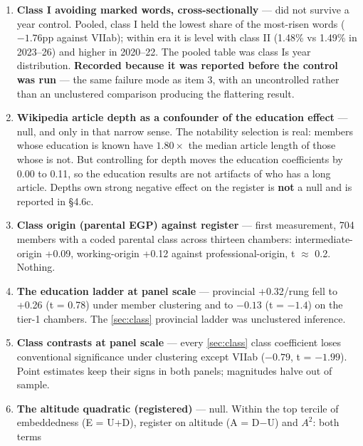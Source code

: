 \begin{enumerate}
  is 0.22--0.25\% in every class, differences within \(\pm\)0.02pp. The class effect
  is a uniform scaling of the instrument, not a re-weighting, when
  "conspicuous" is defined as rare \emph{before} the machines. Defining it
  instead as \emph{risen} and \emph{common} is what produces \cref{sec:chase-flight}\textquotesingle s result.
\item
  \textbf{Class I avoiding marked words, cross-sectionally} --- did not survive a
  year control. Pooled, class I held the lowest share of the most-risen
  words (\(-1.76\)pp against VIIab); within era it is level with class II
  (1.48\% vs 1.49\% in 2023--26) and higher in 2020--22. The pooled table was
  class I\textquotesingle s year distribution. \textbf{Recorded because it was reported before the
  control was run} --- the same failure mode as item 3, with an uncontrolled
  rather than an unclustered comparison producing the flattering result.
\item
  \textbf{Wikipedia article depth as a confounder of the education effect} --- null,
  and only in that narrow sense. The notability selection is real: members
  whose education is known have \(1.80\times\) the median article length of those
  whose is not. But controlling for depth moves the education coefficients by
  0.00 to 0.11, so the education results are not artifacts of who has a long
  article. Depth\textquotesingle s own strong negative effect on the register is \textbf{not} a
  null and is reported in §4.6c.
\item
  \textbf{Class origin (parental EGP) against register} --- first measurement,
  704 members with a coded parental class across thirteen chambers:
  intermediate-origin +0.09, working-origin +0.12 against
  professional-origin, t \(\approx\) 0.2. Nothing.
\item
  \textbf{The education ladder at panel scale} --- provincial +0.32/rung fell to
  +0.26 (t = 0.78) under member clustering and to \(-0.13\) (t = \(-1.4\)) on the
  tier-1 chambers. The \cref{sec:class} provincial ladder was unclustered inference.
\item
  \textbf{Class contrasts at panel scale} --- every \cref{sec:class} class coefficient loses
  conventional significance under clustering except VIIab (\(-0.79\),
  t = \(-1.99\)). Point estimates keep their signs in both panels; magnitudes
  halve out of sample.
\item
  \textbf{The altitude quadratic (registered)} --- null. Within the top tercile of
  embeddedness (E = U+D), register on altitude (A = D\(-\)U) and \(A^{2}\): both terms

\end{enumerate}
